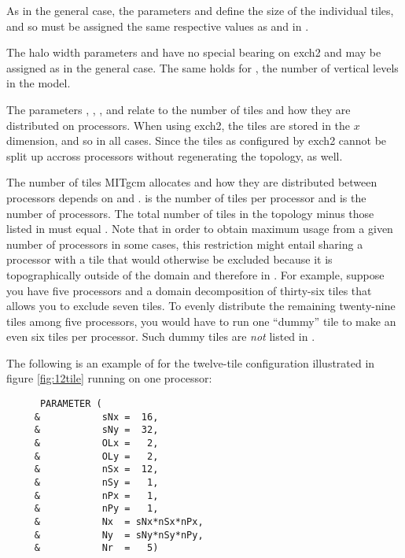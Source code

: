 As in the general case, the parameters  and
 define the size of the individual tiles, and so
must be assigned the same respective values as  and
 in .

The halo width parameters  and 
have no special bearing on exch2 and may be assigned as in the general
case. The same holds for , the number of vertical
levels in the model.

The parameters , ,
, and  relate to the number of
tiles and how they are distributed on processors.  When using exch2,
the tiles are stored in the $x$ dimension, and so
 in all cases.  Since the tiles as
configured by exch2 cannot be split up accross processors without
regenerating the topology,  as well.

The number of tiles MITgcm allocates and how they are distributed
between processors depends on  and
.   is the number of tiles per
processor and  is the number of processors.  The
total number of tiles in the topology minus those listed in
 must equal .  Note that in order to
obtain maximum usage from a given number of processors in some cases,
this restriction might entail sharing a processor with a tile that
would otherwise be excluded because it is topographically outside of
the domain and therefore in .  For example,
suppose you have five processors and a domain decomposition of
thirty-six tiles that allows you to exclude seven tiles.  To evenly
distribute the remaining twenty-nine tiles among five processors, you
would have to run one ``dummy'' tile to make an even six tiles per
processor.  Such dummy tiles are \emph{not} listed in
.

The following is an example of  for the twelve-tile
configuration illustrated in figure \ref{fig:12tile} running on one
processor:

\begin{verbatim}
      PARAMETER (
     &           sNx =  16,
     &           sNy =  32,
     &           OLx =   2,
     &           OLy =   2,
     &           nSx =  12,
     &           nSy =   1,
     &           nPx =   1,
     &           nPy =   1,
     &           Nx  = sNx*nSx*nPx,
     &           Ny  = sNy*nSy*nPy,
     &           Nr  =   5)
\end{verbatim}

